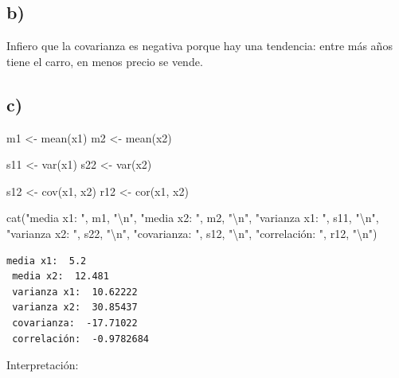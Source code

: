 \documentclass[
]{article}
\newenvironment{Shaded}{\begin{snugshade}}{\end{snugshade}}
\newcommand{\FunctionTok}[1]{\textcolor[rgb]{0.00,0.00,0.00}{#1}}
\newcommand{\NormalTok}[1]{#1}
\newcommand{\OtherTok}[1]{\textcolor[rgb]{0.56,0.35,0.01}{#1}}
\newcommand{\SpecialCharTok}[1]{\textcolor[rgb]{0.00,0.00,0.00}{#1}}
\newcommand{\StringTok}[1]{\textcolor[rgb]{0.31,0.60,0.02}{#1}}
\begin{document}
\hypertarget{b}{%
\subsection{b)}\label{b}}

Infiero que la covarianza es negativa porque hay una tendencia: entre
más años tiene el carro, en menos precio se vende.

\hypertarget{c}{%
\subsection{c)}\label{c}}

\begin{Shaded}
\begin{Highlighting}[]
\NormalTok{m1 }\OtherTok{\textless{}{-}} \FunctionTok{mean}\NormalTok{(x1)}
\NormalTok{m2 }\OtherTok{\textless{}{-}} \FunctionTok{mean}\NormalTok{(x2)}

\NormalTok{s11 }\OtherTok{\textless{}{-}} \FunctionTok{var}\NormalTok{(x1)}
\NormalTok{s22 }\OtherTok{\textless{}{-}} \FunctionTok{var}\NormalTok{(x2)}

\NormalTok{s12 }\OtherTok{\textless{}{-}} \FunctionTok{cov}\NormalTok{(x1, x2)}
\NormalTok{r12 }\OtherTok{\textless{}{-}} \FunctionTok{cor}\NormalTok{(x1, x2)}

\FunctionTok{cat}\NormalTok{(}\StringTok{"media x1: "}\NormalTok{, m1, }\StringTok{"}\SpecialCharTok{\textbackslash{}n}\StringTok{"}\NormalTok{, }
       \StringTok{"media x2: "}\NormalTok{, m2, }\StringTok{"}\SpecialCharTok{\textbackslash{}n}\StringTok{"}\NormalTok{,}
       \StringTok{"varianza x1: "}\NormalTok{, s11, }\StringTok{"}\SpecialCharTok{\textbackslash{}n}\StringTok{"}\NormalTok{,}
       \StringTok{"varianza x2: "}\NormalTok{, s22, }\StringTok{"}\SpecialCharTok{\textbackslash{}n}\StringTok{"}\NormalTok{,}
       \StringTok{"covarianza: "}\NormalTok{, s12, }\StringTok{"}\SpecialCharTok{\textbackslash{}n}\StringTok{"}\NormalTok{,}
       \StringTok{"correlación: "}\NormalTok{, r12, }\StringTok{"}\SpecialCharTok{\textbackslash{}n}\StringTok{"}\NormalTok{)}
\end{Highlighting}
\end{Shaded}

\begin{verbatim}
media x1:  5.2 
 media x2:  12.481 
 varianza x1:  10.62222 
 varianza x2:  30.85437 
 covarianza:  -17.71022 
 correlación:  -0.9782684 
\end{verbatim}

Interpretación:
\end{document}
